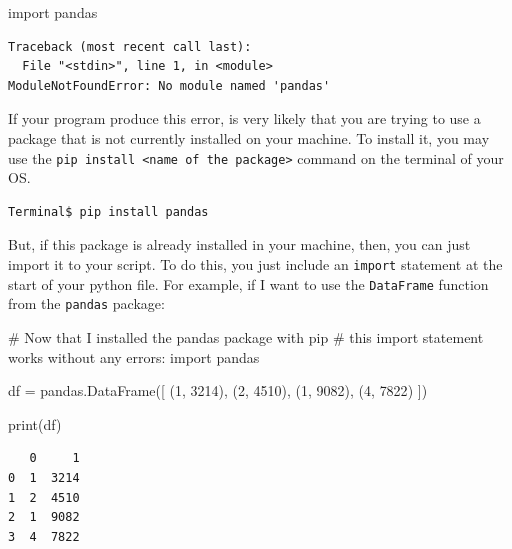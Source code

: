 \documentclass[
  11pt,
  letterpaper,
  DIV=11,
  numbers=noendperiod]{scrreprt}
\newenvironment{Shaded}{\begin{snugshade}}{\end{snugshade}}
\newcommand{\BuiltInTok}[1]{\textcolor[rgb]{0.00,0.23,0.31}{#1}}
\newcommand{\CommentTok}[1]{\textcolor[rgb]{0.37,0.37,0.37}{#1}}
\newcommand{\DecValTok}[1]{\textcolor[rgb]{0.68,0.00,0.00}{#1}}
\newcommand{\ImportTok}[1]{\textcolor[rgb]{0.00,0.46,0.62}{#1}}
\newcommand{\NormalTok}[1]{\textcolor[rgb]{0.00,0.23,0.31}{#1}}
\newcommand{\OperatorTok}[1]{\textcolor[rgb]{0.37,0.37,0.37}{#1}}
\begin{document}
\begin{Shaded}
\begin{Highlighting}[]
\ImportTok{import}\NormalTok{ pandas}
\end{Highlighting}
\end{Shaded}

\begin{verbatim}
Traceback (most recent call last):
  File "<stdin>", line 1, in <module>
ModuleNotFoundError: No module named 'pandas'
\end{verbatim}

If your program produce this error, is very likely that you are trying
to use a package that is not currently installed on your machine. To
install it, you may use the
\texttt{pip\ install\ \textless{}name\ of\ the\ package\textgreater{}}
command on the terminal of your OS.

\begin{verbatim}
Terminal$ pip install pandas
\end{verbatim}

But, if this package is already installed in your machine, then, you can
just import it to your script. To do this, you just include an
\texttt{import} statement at the start of your python file. For example,
if I want to use the \texttt{DataFrame} function from the
\texttt{pandas} package:

\begin{Shaded}
\begin{Highlighting}[]
\CommentTok{\# Now that I installed the \textasciigrave{}pandas\textasciigrave{} package with \textasciigrave{}pip\textasciigrave{}}
\CommentTok{\# this \textasciigrave{}import\textasciigrave{} statement works without any errors:}
\ImportTok{import}\NormalTok{ pandas}

\NormalTok{df }\OperatorTok{=}\NormalTok{ pandas.DataFrame([}
\NormalTok{  (}\DecValTok{1}\NormalTok{, }\DecValTok{3214}\NormalTok{), (}\DecValTok{2}\NormalTok{, }\DecValTok{4510}\NormalTok{), }
\NormalTok{  (}\DecValTok{1}\NormalTok{, }\DecValTok{9082}\NormalTok{), (}\DecValTok{4}\NormalTok{, }\DecValTok{7822}\NormalTok{)}
\NormalTok{])}

\BuiltInTok{print}\NormalTok{(df)}
\end{Highlighting}
\end{Shaded}

\begin{verbatim}
   0     1
0  1  3214
1  2  4510
2  1  9082
3  4  7822
\end{verbatim}
\end{document}

